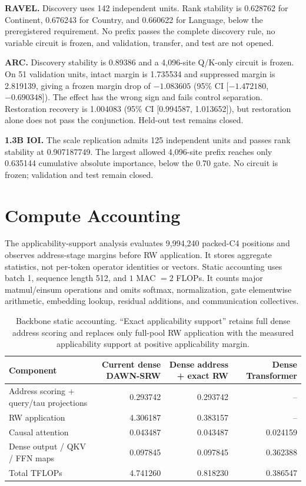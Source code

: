 \documentclass{article}
\newcommand{\DAWN}{DAWN-SRW}
\newcommand{\smallhead}[1]{\vspace{0.25em}\noindent\textbf{#1}}
\begin{document}
\smallhead{RAVEL.}
Discovery uses 142 independent units. Rank stability is 0.628762 for
Continent, 0.676243 for Country, and 0.660622 for Language, below the
preregistered requirement. No prefix passes the complete discovery rule, no
variable circuit is frozen, and validation, transfer, and test are not opened.

\smallhead{ARC.}
Discovery stability is 0.89386 and a 4,096-site Q/K-only circuit is frozen.
On 51 validation units, intact margin is 1.735534 and suppressed margin is
2.819139, giving a frozen margin drop of \(-1.083605\) (95\% CI
[\(-1.472180\), \(-0.690348\)]). The effect has the wrong sign and fails
control separation. Restoration recovery is 1.004083 (95\% CI
[0.994587, 1.013652]), but restoration alone does not pass the conjunction.
Held-out test remains closed.

\smallhead{1.3B IOI.}
The scale replication admits 125 independent units and passes rank stability
at 0.907187749. The largest allowed 4,096-site prefix reaches only 0.635144
cumulative absolute importance, below the 0.70 gate. No circuit is frozen;
validation and test remain closed.

\section{Compute Accounting}
\label{app:compute}

The applicability-support analysis evaluates 9,994,240 packed-C4 positions and
observes
address-stage margins before RW application. It stores aggregate statistics,
not per-token operator identities or vectors. Static accounting uses batch 1,
sequence length 512, and \(1\) MAC \(=2\) FLOPs. It counts major
matmul/einsum operations and omits softmax, normalization, gate elementwise
arithmetic, embedding lookup, residual additions, and communication
collectives.

\begin{table}[!t]
\centering
\caption{Backbone static accounting. ``Exact applicability support'' retains full dense
address scoring and replaces only full-pool RW application with the measured
applicability support at positive applicability margin.}
\scriptsize
\renewcommand{\arraystretch}{0.96}
\begin{tabular}{lrrr}
\toprule
Component & Current dense \DAWN{} & Dense address + exact RW & Dense Transformer\\
\midrule
Address scoring + query/tau projections & 0.293742 & 0.293742 & --\\
RW application & 4.306187 & 0.383157 & --\\
Causal attention & 0.043487 & 0.043487 & 0.024159\\
Dense output / QKV / FFN maps & 0.097845 & 0.097845 & 0.362388\\
\midrule
Total TFLOPs & 4.741260 & 0.818230 & 0.386547\\
\bottomrule
\end{tabular}
\end{table}
\end{document}
